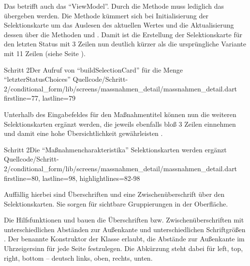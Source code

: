 Das betrifft auch das \enquote{ViewModel}.
Durch die Methode  muss lediglich das  übergeben werden.
Die Methode kümmert sich bei Initialisierung der Selektionskarte um das Auslesen des aktuellen Wertes  und die Aktualisierung dessen über die Methoden   und  .
Damit ist die Erstellung der Selektionskarte für den letzten Status mit 3 Zeilen \Lst{\ref{lst:Schritt2BuildSelectionCardLetzterStatusChoices}} nun deutlich kürzer als die ursprüngliche Variante mit 11 Zeilen (siehe Seite \pageref{lst:Schritt1AusgabeDerFormularfelder}).

\begin{alexlisting}{Schritt 2}{Der Aufruf von \enquote{buildSelectionCard} für die Menge \enquote{letzterStatusChoices}}
  {Quellcode/Schritt-2/conditional_form/lib/screens/massnahmen_detail/massnahmen_detail.dart}
  {firstline=77, lastline=79}
  \label{lst:Schritt2BuildSelectionCardLetzterStatusChoices}
\end{alexlisting}

Unterhalb des Eingabefeldes für den Maßnahmentitel können nun die weiteren Selektionskarten ergänzt werden, die jeweils ebenfalls bloß 3 Zeilen einnehmen und damit eine hohe Übersichtlichkeit gewährleisten .

\begin{alexlisting}{Schritt 2}{Die \enquote{Maßnahmencharakteristika} Selektionskarten werden ergänzt}
  {Quellcode/Schritt-2/conditional_form/lib/screens/massnahmen_detail/massnahmen_detail.dart}
  {firstline=80, lastline=98, highlightlines={82-98}}
  \label{lst:Schritt2MassnahmencharakteristikaSelektionskartenWerdenErgaenzt}
\end{alexlisting}

Auffällig hierbei sind Überschriften  und eine Zwischenüberschrift  über den Selektionskarten. Sie sorgen für sichtbare Gruppierungen in der Oberfläche.

Die Hilfsfunktionen 
und  bauen die Überschriften  bzw. Zwischenüberschriften  mit unterschiedlichen Abständen zur Außenkante 
und unterschiedlichen Schriftgrößen .
Der benannte Konstruktor  der Klasse  erlaubt, die Abstände zur Außenkante im Uhrzeigersinn für jede Seite festzulegen.
Die Abkürzung  steht dabei für left, top, right, bottom -- deutsch links, oben, rechts, unten.

